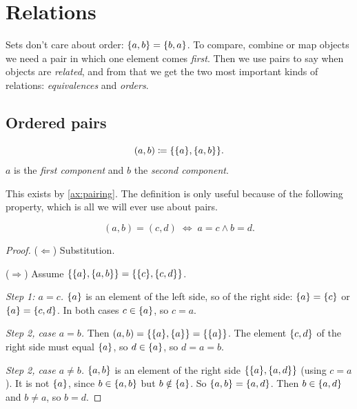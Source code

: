 \chapter{Relations}
\label{ch:relations}

Sets don't care about order: $\lbrace a, b \rbrace = \lbrace b, a \rbrace$. To compare, combine or map
objects we need a pair in which one element comes \emph{first}. Then we use pairs
to say when objects are \emph{related}, and from that we get the two most
important kinds of relations: \emph{equivalences} and \emph{orders}.

\section{Ordered pairs}

\begin{definition}
\label{def:pair}
\[
  (a, b) \coloneqq \lbrace \lbrace a \rbrace, \lbrace a, b \rbrace \rbrace.
\]
$a$ is the \emph{first component} and $b$ the \emph{second component}.
\end{definition}

This exists by \cref{ax:pairing}. The definition is only useful because of the
following property, which is all we will ever use about pairs.

\begin{theorem}
\label{thm:pair}
\[
  (a, b) = (c, d) \;\Leftrightarrow\; a = c \land b = d.
\]
\end{theorem}

\begin{proof}
($\Leftarrow$) Substitution.

($\Rightarrow$) Assume $\lbrace \lbrace a \rbrace, \lbrace a, b \rbrace \rbrace = \lbrace \lbrace c \rbrace, \lbrace c, d \rbrace \rbrace$.

\emph{Step 1: $a = c$.} $\lbrace a \rbrace$ is an element of the left side, so of the right
side: $\lbrace a \rbrace = \lbrace c \rbrace$ or $\lbrace a \rbrace = \lbrace c, d \rbrace$. In both cases $c \in
\lbrace a \rbrace$, so $c = a$.

\emph{Step 2, case $a = b$.} Then $(a, b) = \lbrace \lbrace a \rbrace, \lbrace a \rbrace \rbrace =
\lbrace \lbrace a \rbrace \rbrace$. The element $\lbrace c, d \rbrace$ of the right side must equal $\lbrace a \rbrace$,
so $d \in \lbrace a \rbrace$, so $d = a = b$.

\emph{Step 2, case $a \neq b$.} $\lbrace a, b \rbrace$ is an element of the right side
$\lbrace \lbrace a \rbrace, \lbrace a, d \rbrace \rbrace$ (using $c = a$). It is not $\lbrace a \rbrace$, since $b \in
\lbrace a, b \rbrace$ but $b \notin \lbrace a \rbrace$. So $\lbrace a, b \rbrace = \lbrace a, d \rbrace$. Then $b \in
\lbrace a, d \rbrace$ and $b \neq a$, so $b = d$.
\end{proof}

